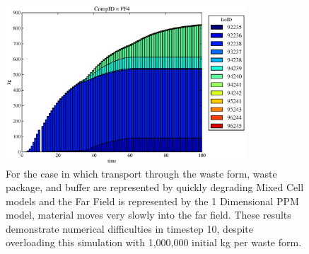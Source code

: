 
\begin{figure}[ht]
\includegraphics[width=0.8\textwidth]{./chapters/demonstration/base/1dppmff.eps}
\caption[$^{235}U$ residence 1 Dimensional PPM Model.]{
For the case in which transport through the waste form, waste package, and 
buffer are represented by quickly degrading Mixed Cell models and the Far Field 
is represented by the 1 Dimensional PPM model, material moves very slowly into 
the far field. These results demonstrate numerical difficulties in timestep 10, 
despite overloading this simulation with 1,000,000 initial kg per waste form.
}
\label{fig:1dppmall}
\end{figure}
